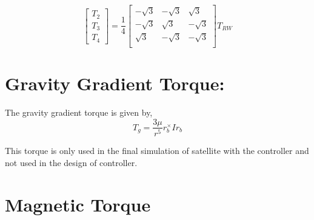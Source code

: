 \documentclass[10pt,a4paper]{report}
\begin{document}
\begin{equation}
\begin{bmatrix}
T_{2}\\T_{3}\\T_{4}
\end{bmatrix}
=\frac{1}{4}\begin{bmatrix}
-\sqrt{3}&-\sqrt{3}&\sqrt{3}\\
-\sqrt{3}&\sqrt{3}&-\sqrt{3}\\
\sqrt{3}&-\sqrt{3}&-\sqrt{3}\\
\end{bmatrix}
T_{RW}
\end{equation}


\section{Gravity Gradient Torque:}
The gravity gradient torque is given by,
	\begin{equation}
	T_{g}=\frac{3\mu}{r^{5}}r_{b}^{\times}Ir_{b}
	\end{equation}

This torque is only used in the final simulation of satellite with the controller and not used in the design of controller.

\section{Magnetic Torque}
\end{document}
